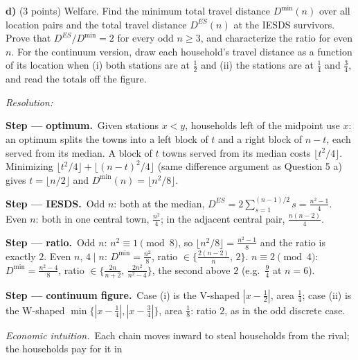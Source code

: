 \documentclass[11pt,a4paper]{article}
\newif\ifsolucoes
\newcommand{\espacoresol}{5cm}   %
\newcommand{\resolespaco}{\ifsolucoes\else\par\textit{Resolution:}\vspace{\espacoresol}\par\fi}
\newcommand{\passo}[2]{\par\smallskip\noindent\textbf{Step --- #1.}~#2}
\newcommand{\intuicao}[1]{\par\smallskip\noindent\textit{Economic intuition.}~#1}
\begin{document}
\textbf{d)} (3 points) Welfare. Find the minimum total travel distance $D^{\min}(n)$ over all location
pairs and the total travel distance $D^{ES}(n)$ at the IESDS survivors. Prove that
$D^{ES}/D^{\min}=2$ for every odd $n\ge3$, and characterize the ratio for even $n$. For the
continuum version, draw each household's travel distance as a function of its location when (i) both
stations are at $\tfrac12$ and (ii) the stations are at $\tfrac14$ and $\tfrac34$, and read the totals
off the figure.
\resolespaco
\begin{sol}
\passo{optimum}{Given stations $x<y$, households left of the midpoint use $x$: an optimum splits the
towns into a left block of $t$ and a right block of $n-t$, each served from its median. A block of $t$
towns served from its median costs $\lfloor t^2/4\rfloor$. Minimizing
$\lfloor t^2/4\rfloor+\lfloor(n-t)^2/4\rfloor$ (same difference argument as Question 5 a) gives
$t=\lfloor n/2\rfloor$ and $D^{\min}(n)=\lfloor n^2/8\rfloor$.}
\passo{IESDS}{Odd $n$: both at the median, $D^{ES}=2\sum_{s=1}^{(n-1)/2}s=\tfrac{n^2-1}4$. Even $n$:
both in one central town, $\tfrac{n^2}4$; in the adjacent central pair, $\tfrac{n(n-2)}4$.}
\passo{ratio}{Odd $n$: $n^2\equiv1\pmod 8$, so $\lfloor n^2/8\rfloor=\tfrac{n^2-1}8$ and the ratio is
exactly $2$. Even $n$, $4\mid n$: $D^{\min}=\tfrac{n^2}8$, ratio $\in\{\tfrac{2(n-2)}n,\,2\}$.
$n\equiv2\pmod4$: $D^{\min}=\tfrac{n^2-4}8$, ratio $\in\{\tfrac{2n}{n+2},\,\tfrac{2n^2}{n^2-4}\}$, the
second above $2$ (e.g.\ $\tfrac94$ at $n=6$).}
\passo{continuum figure}{Case (i) is the V-shaped $|x-\tfrac12|$, area $\tfrac14$; case (ii) is the
W-shaped $\min\{|x-\tfrac14|,|x-\tfrac34|\}$, area $\tfrac18$: ratio $2$, as in the odd discrete case.}
\begin{center}
\end{center}
\intuicao{Each chain moves inward to steal households from the rival; the households pay for it in
}
\end{sol}
\end{document}
